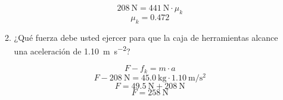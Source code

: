 \documentclass[Física - Práctica.root.tex]{subfiles}
\begin{document}
\begin{enumerate}
\begin{enumerate}
\begin{center}
                  \[ \SI{208}{\newton} = \SI{441}{\newton}\cdot\mu_k \]
                  \[ \boxed{ \mu_k = \num{0,472} } \]
                \end{center}
          \item ¿Qué fuerza debe usted ejercer para que la caja de herramientas alcance una aceleración de \SI[per-mode=symbol]{1,10}{\meter\per\second\squared}?
                \begin{center}
                  \[ F - f_k = m\cdot a \]
                  \[ F - \SI{208}{\newton} = \SI{45,0}{\kilo\gram}\cdot\SI{1,10}{\meter\per\second\squared} \]
                  \[ F = \SI{49,5}{\newton} + \SI{208}{\newton} \]
                  \[ F = \SI{258}{\newton} \]
                \end{center}
        \end{enumerate}
\end{enumerate}
\end{document}
